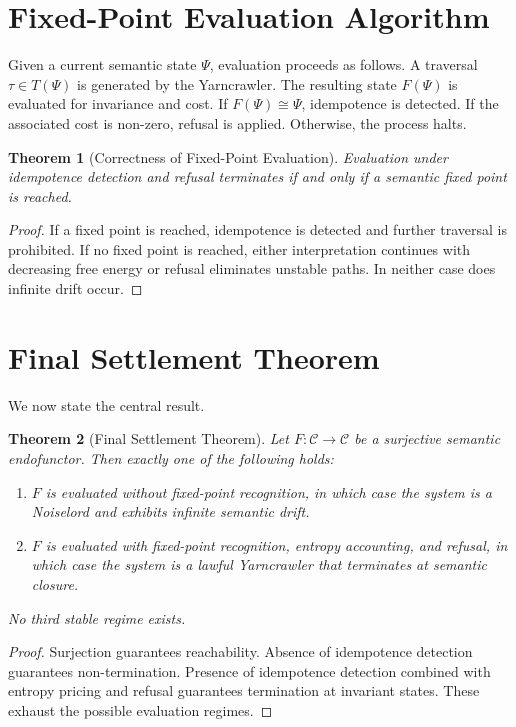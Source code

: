 \documentclass[12pt]{article}
\newtheorem{theorem}{Theorem}[section]
\theoremstyle{remark}
\begin{document}
\section{Fixed-Point Evaluation Algorithm}

Given a current semantic state $\Psi$, evaluation proceeds as follows. A traversal $\tau \in T(\Psi)$ is generated by the Yarncrawler. The resulting state $F(\Psi)$ is evaluated for invariance and cost. If $F(\Psi) \cong \Psi$, idempotence is detected. If the associated cost is non-zero, refusal is applied. Otherwise, the process halts.

\begin{theorem}[Correctness of Fixed-Point Evaluation]
Evaluation under idempotence detection and refusal terminates if and only if a semantic fixed point is reached.
\end{theorem}

\begin{proof}
If a fixed point is reached, idempotence is detected and further traversal is prohibited. If no fixed point is reached, either interpretation continues with decreasing free energy or refusal eliminates unstable paths. In neither case does infinite drift occur.
\end{proof}

\section{Final Settlement Theorem}

We now state the central result.

\begin{theorem}[Final Settlement Theorem]
Let $F : \mathcal{C} \to \mathcal{C}$ be a surjective semantic endofunctor. Then exactly one of the following holds:
\begin{enumerate}
\item $F$ is evaluated without fixed-point recognition, in which case the system is a Noiselord and exhibits infinite semantic drift.
\item $F$ is evaluated with fixed-point recognition, entropy accounting, and refusal, in which case the system is a lawful Yarncrawler that terminates at semantic closure.
\end{enumerate}
No third stable regime exists.
\end{theorem}

\begin{proof}
Surjection guarantees reachability. Absence of idempotence detection guarantees non-termination. Presence of idempotence detection combined with entropy pricing and refusal guarantees termination at invariant states. These exhaust the possible evaluation regimes.
\end{proof}
\end{document}

